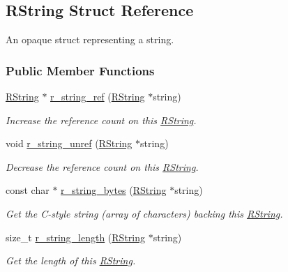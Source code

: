 \hypertarget{struct_r_string}{\subsection{R\-String Struct Reference}
\label{struct_r_string}
}


An opaque struct representing a string.  


\subsubsection*{Public Member Functions}
\begin{DoxyCompactItemize}
\item 
\hyperlink{struct_r_string}{R\-String} $\ast$ \hyperlink{struct_r_string_a16c711c95a1852b3315664834421e143}{r\-\_\-string\-\_\-ref} (\hyperlink{struct_r_string}{R\-String} $\ast$string)
\begin{DoxyCompactList}\small\item\em Increase the reference count on this \hyperlink{struct_r_string}{R\-String}. \end{DoxyCompactList}\item 
void \hyperlink{struct_r_string_a934c8be70f5c569cd25a0cf93304e17a}{r\-\_\-string\-\_\-unref} (\hyperlink{struct_r_string}{R\-String} $\ast$string)
\begin{DoxyCompactList}\small\item\em Decrease the reference count on this \hyperlink{struct_r_string}{R\-String}. \end{DoxyCompactList}\item 
const char $\ast$ \hyperlink{struct_r_string_aac90a2f2447899389bffdb05a249573e}{r\-\_\-string\-\_\-bytes} (\hyperlink{struct_r_string}{R\-String} $\ast$string)
\begin{DoxyCompactList}\small\item\em Get the C-\/style string (array of characters) backing this \hyperlink{struct_r_string}{R\-String}. \end{DoxyCompactList}\item 
size\-\_\-t \hyperlink{struct_r_string_a0a79ee2cc5a5db38f5841051f6591c5b}{r\-\_\-string\-\_\-length} (\hyperlink{struct_r_string}{R\-String} $\ast$string)
\begin{DoxyCompactList}\small\item\em Get the length of this \hyperlink{struct_r_string}{R\-String}. \end{DoxyCompactList}\end{DoxyCompactItemize}



